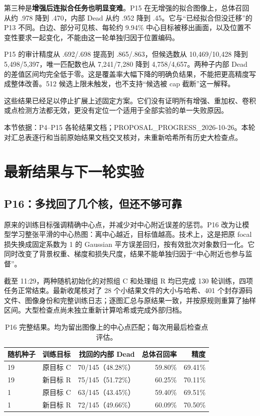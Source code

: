 \documentclass[UTF8,zihao=-4,fontset=windows]{ctexart}
\newcommand{\src}[1]{\par{\footnotesize\color{gray}本节依据：#1}\par}
\begin{document}
第三种是\textbf{增强后连拟合任务也明显变难}。P15 在无增强的拟合图像上，总体召回从约 .978 降到 .470，内部 Dead 从约 .952 降到 .45。它与“已经拟合但没迁移”的 P13 不同。白边、部分可见核、每轮约 9.94\% 中心目标被移出画面，以及位置不变性要求一起变化，不能由这一轮单独归因于位置编码。

P15 的审计精度从 .692/.698 提高到 .865/.863，但候选数从 10,469/10,428 降到 5,498/5,397，唯一匹配数也从 7,241/7,280 降到 4,758/4,657。两种子内部 Dead 的差值区间均完全低于零。这是覆盖率大幅下降的明确负结果，不能把更高精度写成整体改善。512 候选上限未触发，也不支持“候选被 cap 截断”这一解释。

这些结果已经足以停止扩展上述固定方案。它们没有证明所有增强、重加权、卷积或点检测方法都无效，更没有定位一个适用于全部实验的单一失败原因。

\src{P4--P15 各轮结果文档；PROPOSAL\_\allowbreak{}PROGRESS\_\allowbreak{}2026-10-26。本轮对汇总表逐行和当前原始结果文档交叉核对，未重新哈希所有历史大检查点。}

\section{最新结果与下一轮实验}

\subsection{P16：多找回了几个核，但还不够可靠}

原来的训练目标强调精确中心点，并减少对中心附近误差的惩罚。P16 改为让模型学习整张平滑的中心热图：离中心越近，目标值越高。技术上，这是把原 focal 损失换成固定系数为 1 的 Gaussian 平方误差回归，按有效批次对象数归一化。它同时改变了背景权重、梯度和损失尺度，结果不能单独归因于“中心附近也参与监督”。

截至 11:29，两种随机初始化的对照组 C 和处理组 R 均已完成 130 轮训练，四项任务正常结束。最新收尾核对了 28 个小结果文件的大小与哈希、401 个封存源码文件、图像身份和完整训练日志；逐图汇总与原结果一致，并按原规则重算了抽样区间。大型检查点尚未独立重新计算哈希或完成外部归档。

\begin{table}[H]\centering\small
\begin{tabular}{llrrr}\toprule
随机种子 & 训练目标 & 找回的内部 Dead & 总体召回率 & 精度\\\midrule
19 & 原目标 C & 70/145（48.28\%） & 59.80\% & 69.41\%\\
19 & 新目标 R & 75/145（51.72\%） & 60.25\% & 70.11\%\\
1 & 原目标 C & 63/145（43.45\%） & 59.40\% & 69.51\%\\
1 & 新目标 R & 72/145（49.66\%） & 60.09\% & 70.50\%\\\bottomrule
\end{tabular}
\caption{P16 完整结果。均为留出图像上的中心点匹配；每次用最后检查点评估。}
\end{table}
\end{document}
